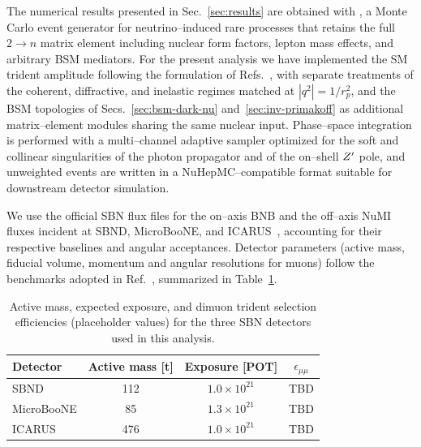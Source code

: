 The numerical results presented in Sec.~\ref{sec:results} are obtained
with \Neptune, a Monte Carlo event generator for neutrino--induced
rare processes that retains the full $2\to n$ matrix element including
nuclear form factors, lepton mass effects, and arbitrary BSM mediators.
For the present analysis we have implemented the SM trident amplitude
following the formulation of Refs.~\cite{Ballett:2018uuc,Zhou:2019vxt},
with separate treatments of the coherent, diffractive, and inelastic
regimes matched at $|q^2| = 1/r_p^2$, and the BSM topologies of
Secs.~\ref{sec:bsm-dark-nu} and~\ref{sec:inv-primakoff} as additional
matrix--element modules sharing the same nuclear input.  Phase--space
integration is performed with a multi--channel adaptive sampler
optimized for the soft and collinear singularities of the photon
propagator and of the on--shell $Z^{\prime}$ pole, and unweighted events are
written in a NuHepMC--compatible format suitable for downstream
detector simulation.

We use the official SBN flux files for the on--axis BNB and the
off--axis NuMI fluxes incident at SBND, MicroBooNE, and
ICARUS~\cite{SBN-proposal}, accounting for their respective baselines
and angular acceptances.  Detector parameters (active mass, fiducial
volume, momentum and angular resolutions for muons) follow the
benchmarks adopted in Ref.~\cite{Altmannshofer:2019zhy}, summarized
in Table~\ref{tab:detectors}.

\begin{table}[h]
  \caption{Active mass, expected exposure, and dimuon trident
    selection efficiencies (placeholder values) for the three SBN
    detectors used in this analysis.}
  \label{tab:detectors}
  \begin{ruledtabular}
  \begin{tabular}{lccc}
   Detector & Active mass [t] & Exposure [POT] & $\epsilon_{\mu\mu}$ \\ \hline
   SBND      & 112 & $1.0\times 10^{21}$ & TBD \\
   MicroBooNE&  85 & $1.3\times 10^{21}$ & TBD \\
   ICARUS    & 476 & $1.0\times 10^{21}$ & TBD \\
  \end{tabular}
  \end{ruledtabular}
\end{table}

